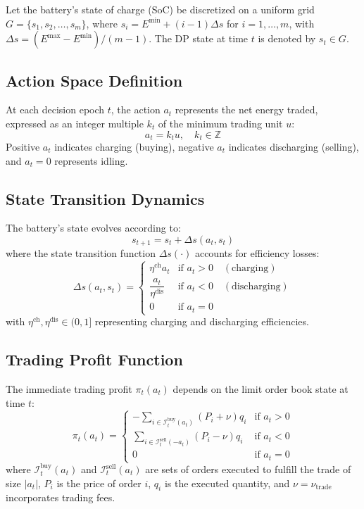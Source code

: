 \documentclass[10pt,twocolumn]{article}
\begin{document}
Let the battery's state of charge (SoC) be discretized on a uniform grid $G = \{s_1, s_2, \ldots, s_m\}$, where $s_i = E^{\min} + (i-1)\Delta s$ for $i = 1, \ldots, m$, with $\Delta s = (E^{\max} - E^{\min})/(m-1)$. The DP state at time $t$ is denoted by $s_t \in G$.

\subsection{Action Space Definition}

At each decision epoch $t$, the action $a_t$ represents the net energy traded, expressed as an integer multiple $k_t$ of the minimum trading unit $u$:
\[
a_t = k_t u, \quad k_t \in \mathbb{Z}
\]
Positive $a_t$ indicates charging (buying), negative $a_t$ indicates discharging (selling), and $a_t = 0$ represents idling.

\subsection{State Transition Dynamics}

The battery's state evolves according to:
\[
s_{t+1} = s_t + \Delta s(a_t, s_t)
\]
where the state transition function $\Delta s(\cdot)$ accounts for efficiency losses:
\[
\Delta s(a_t, s_t) = 
\begin{cases}
\eta^{\text{ch}} a_t & \text{if } a_t > 0 \quad (\text{charging}) \\
\dfrac{a_t}{\eta^{\text{dis}}} & \text{if } a_t < 0 \quad (\text{discharging}) \\
0 & \text{if } a_t = 0
\end{cases}
\]
with $\eta^{\text{ch}}, \eta^{\text{dis}} \in (0, 1]$ representing charging and discharging efficiencies.

\subsection{Trading Profit Function}

The immediate trading profit $\pi_t(a_t)$ depends on the limit order book state at time $t$:
\[
\pi_t(a_t) = 
\begin{cases}
-\displaystyle\sum_{i \in \mathcal{I}_t^{\text{buy}}(a_t)} (P_i + \nu) q_i & \text{if } a_t > 0 \\
\displaystyle\sum_{i \in \mathcal{I}_t^{\text{sell}}(-a_t)} (P_i - \nu) q_i & \text{if } a_t < 0 \\
0 & \text{if } a_t = 0
\end{cases}
\]
where $\mathcal{I}_t^{\text{buy}}(a_t)$ and $\mathcal{I}_t^{\text{sell}}(a_t)$ are sets of orders executed to fulfill the trade of size $|a_t|$, $P_i$ is the price of order $i$, $q_i$ is the executed quantity, and $\nu = \nu_{\text{trade}}$ incorporates trading fees.
\end{document}
